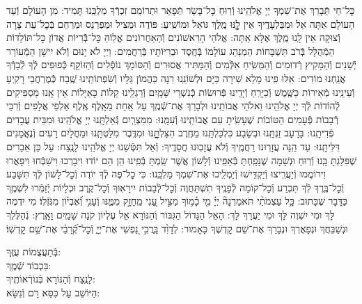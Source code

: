 \documentclass[twoside, openany, parskip=half, 11pt]{book}
\begin{document}
\label{nishmas}
 כׇּל־חַי תְּֿבָרֵךְ אֶת־שִׁמְךָ יְיָ אֱלֹהֵֽינוּ וְֿרֽוּחַ כׇּל־בָּשָׂר תְּֿפָאֵר וּתְרוֹמֵם זִכְרְֿךָ מַלְכֵּֽנוּ תָּמִיד: מִן הָעוֹלָם וְֿעַד הָעוֹלָם אַתָּה אֵל וּמִבַּלְעָדֶֽיךָ אֵין לׇׇׇׇָֽנּוּ מֶֽלֶךְ גּוֹאֵל וּמוֹשִֽׁיעַ:
פּוֹדֶה וּמַצִיל וּמְפַרְנֵס וּמְרַחֵם בְּֿכׇל־עֵת צָרָה וְֿצוּקָה אֵין לָֽנוּ מֶֽלֶךְ אֶלָּא אַֽתָּה: אֱלֹהֵי הָרִאשׁוֹנִים וְֿהָאַחֲרוֹנִים אֱלֽוֹהַּ כׇּל־בְּֿֿרִיּוֹת אֲדוֹן כׇּל־תּוֹלָדוֹת הַמְֿהֻלָּל בְּֿרֹב תִּשְׁבָּחוֹת הַמְנַהֵג עוֹלָמוֹ בְּֿחֶֽסֶד וּבְרִיּוֹתָיו בְּֿרַחֲמִים: וַיְיָ לֹא יָנוּם וְֿלֹא יִישָׁן הַמְֿעוֹרֵר יְֿשֵׁנִים וְֿהַמֵּקִיץ רְֿדוּמִים וְֿהַמֵּשִֽׂיחַ אִלְּֿמִים וְֿהַמַּתִּיר אֲסוּרִים וְֿהַסּוֹמֵךְ נוֹפְֿלִים וְֿהַזּוֹקֵף כְּֿפוּפִים לְֿךָ לְֿבַדְּֿךָ אֲנַֽחְנוּ מוֹדִים: אִֽלּוּ פִֽינוּ מָלֵא שִׁירָה כַּיָּם וּלְשׁוֹנֵֽנוּ רִנָּה כַּהֲמוֹן גַּלָּיו וְֿשִׂפְתוֹתֵֽינוּ שֶֽׁבַח כְּֿמֶרְחֲבֵי רָקִֽיעַ וְֿעֵינֵֽינוּ מְֿאִירוֹת כַּשֶּֽׁמֶשׁ וְֿכַיָּרֵֽחַ וְֿיָדֵֽינוּ פְּֿרוּשׂוֹת כְּֿנִשְׁרֵי שָּׁמָֽיִם וְֿרַגְלֵֽינוּ קַלּוֹת כָּאַיָּלוֹת אֵין אָֽנוּ מַסְפִּיקִים לְֿהוֹדוֹת לְֿךָ יְיָ אֱלֹהֵֽינוּ וֵאלֹהֵי אֲבוֹתֵֽינוּ וּלְבָרֵךְ אֶת־שְֿׁמֶֽךָ עַל אַֽחַת מֵאָֽלֶף אֶֽלֶף אַלְפֵי אֲלָפִים וְֿרִבֵּי רְֿבָבוֹת פְּֿעָמִים הַטּוֹבוֹת שֶׁעָשִֽׂיתָ עִם אֲבוֹתֵֽינוּ וְֿעִמָּֽנוּ: מִמִּצְרַֽיִם גְּֿאַלְתָּֽנוּ יְיָ אֱלֹהֵֽינוּ וּמִבֵּית עֲבָדִים פְּֿדִיתָֽנוּ: בָּרָעָב זַנְתָּֽנוּ וּבְשָׂבָע כִּלְכַּלְתָּֽנוּ מֵחֶֽרֶב הִצַּלְתׇׇׇׇָּֽנּוּ וּמִדֶּֽבֶר מִלַּטְתָּֽנוּ וּמֵחֳלָיִם רָעִים וְֿנֶאֱמָנִים דִּלִּיתָֽנוּ: עַד הֵֽנָּה עֲזָרֽוּנוּ רַחֲמֶֽיךָ וְֿלֹא עֲזָבֽוּנוּ חֲסָדֶֽיךָ: וְֿאַל תִּטְּֿשֵׁנוּ יְיָ אֱלֹהֵֽינוּ לָנֶֽצַח: עַל כֵּן אֵבָרִים שֶׁפִּלַּגְתָּ בָּֽנוּ וְֿרֽוּחַ וּנְשָׁמָה שֶׁנָּפַֽחְתָּ בְּֿאַפֵּֽינוּ וְֿלָשׁוֹן אֲשֶׁר שַֽׂמְתָּ בְּֿפִֽינוּ הֵן הֵם יוֹדוּ וִיבָרְכוּ וִישַׁבְּֿחוּ וִיפָאֲרוּ וִירוֹמֲמוּ וְֿיַעֲרִֽיצוּ וְֿיַקְדִּֽישׁוּ וְֿיַמְלִֽיכוּ אֶת־שִׁמְךָ מַלְכֵּֽנוּ: כִּי כׇל־פֶּה לְֿךָ יוֹדֶה וְֿכׇל־לָשׁוֹן לְֿךָ תִּשָּׁבַע וְֿכׇל־בֶּֽרֶךְ לְֿךָ תִּכְרַע וְֿכׇל־קוֹמָה לְֿפָנֶֽיךָ תִשְׁתַּחֲוֶה וְֿכׇל־לְֿבָבוֹת יִירָאֽוּךָ וְֿכׇל־קֶֽרֶב וּכְלָיוֹת יְֿזַמְּֿרוּ לִשְׁמֶֽךָ כַּדָּבָר שֶׁכָּתוּב:
כָּ֥ל עַצְמֹתַ֨י תֹּאמַרְנָה֘ יְיָ֗ מִ֤י כָ֫מ֥וֹךָ מַצִּ֣יל עָ֭נִי מֵֽחָזָ֣ק מִמֶּ֑נּוּ וְֿעָנִ֥י וְֿ֝אֶבְי֗וֹן מִגֹּֽזְֿלֽוֹ׃ מִי יִדְמֶה לָּךְ וּמִי יִשְׁוֶה לָּךְ וּמִי יַעֲרָךְ לָּךְ: הָאֵל הַגָּדוֹל הַגִּבּוֹר וְֿהַנּוֹרָא אֵל עֶלְיוֹן קֹנֵה שָׁמַֽיִם וָאָֽרֶץ:
נְֿהַלֶּלְךָ וּנְשַׁבֵּחֲךָ וּנְפָאֶרְךָ וּנְבָרֵךְ אֶת־שֵׁם קׇדְשֶׁךָ כָּאָמוּר:
לְדָוִ֨ד בָּֽרֲכִ֣י נַ֭פְשִׁי אֶת־יְיָ֑ וְֿכׇל־קְֿ֝רָבַ֗י אֶת־שֵׁ֥ם קׇדְשֽׁוֹ׃


 בְּֿתַעֲצֻמוֹת עֻזֶּֽךָ:\\
 בִּכְבוֹד שְֿׁמֶֽךָ:\\
 לָנֶֽצַח וְֿהַנּוֹרָא בְּֿנוֹרְֿאוֹתֶֽיךָ:\\
 הַיּוֹשֵׁב עַל כִּסֵּא רָם וְֿנִשָּׂא:
\end{document}
